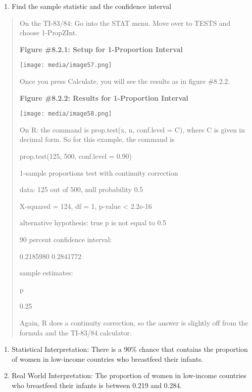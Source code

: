 \documentclass[]{book}
\providecommand{\tightlist}{%
  \setlength{\itemsep}{0pt}\setlength{\parskip}{0pt}}
\begin{document}
\begin{enumerate}
\def\labelenumi{\arabic{enumi}.}
\setcounter{enumi}{2}
\tightlist
\item
  Find the sample statistic and the confidence interval
\end{enumerate}

\begin{quote}
On the TI-83/84: Go into the STAT menu. Move over to TESTS and choose
1-PropZInt.

\textbf{Figure \#8.2.1: Setup for 1-Proportion Interval}

\texttt{[image: media/image57.png]}

Once you press Calculate, you will see the results as in figure
\#8.2.2.

\textbf{Figure \#8.2.2: Results for 1-Proportion Interval}

\texttt{[image: media/image58.png]}

On R: the command is prop.test(x, n, conf.level = C), where C is given
in decimal form. So for this example, the command is

prop.test(125, 500, conf.level = 0.90)

1-sample proportions test with continuity correction

data: 125 out of 500, null probability 0.5

X-squared = 124, df = 1, p-value \textless{} 2.2e-16

alternative hypothesis: true p is not equal to 0.5

90 percent confidence interval:

0.2185980 0.2841772

sample estimates:

p

0.25

Again, R does a continuity correction, so the answer is slightly off
from the formula and the TI-83/84 calculator.
\end{quote}

\begin{enumerate}
\def\labelenumi{\arabic{enumi}.}
\setcounter{enumi}{3}
\item
  Statistical Interpretation: There is a 90\% chance that contains the proportion of women in low-income countries who breastfeed their infants.
\item
  Real World Interpretation: The proportion of women in low-income countries who breastfeed their infants is between 0.219 and 0.284.
\end{enumerate}
\end{document}
